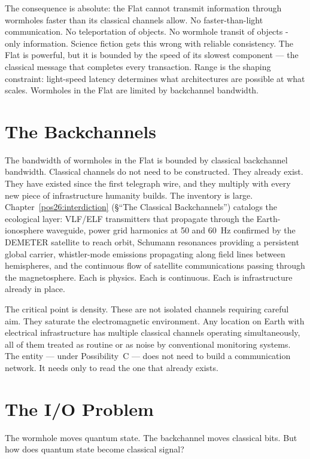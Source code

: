 The consequence is absolute: the Flat cannot transmit information through wormholes faster than its classical channels allow. No faster-than-light communication. No teleportation of objects. No wormhole transit of objects - only information. Science fiction gets this wrong with reliable consistency. The Flat is powerful, but it is bounded by the speed of its slowest component --- the classical message that completes every transaction. Range is the shaping constraint: light-speed latency determines what architectures are possible at what scales. Wormholes in the Flat are limited by backchannel bandwidth.

\section*{The Backchannels}
\label{what-is-the-flat:the-backchannels}
The bandwidth of wormholes in the Flat is bounded by classical backchannel bandwidth. Classical channels do not need to be constructed. They already exist. They have existed since the first telegraph wire, and they multiply with every new piece of infrastructure humanity builds. The inventory is large. Chapter~\ref{pos26:interdiction} (\S``The Classical Backchannels'') catalogs the ecological layer: VLF/ELF transmitters that propagate through the Earth-ionosphere waveguide, power grid harmonics at 50 and 60~Hz confirmed by the DEMETER satellite to reach orbit, Schumann resonances providing a persistent global carrier, whistler-mode emissions propagating along field lines between hemispheres, and the continuous flow of satellite communications passing through the magnetosphere. Each is physics. Each is continuous. Each is infrastructure already in place.

The critical point is density. These are not isolated channels requiring careful aim. They saturate the electromagnetic environment. Any location on Earth with electrical infrastructure has multiple classical channels operating simultaneously, all of them treated as routine or as noise by conventional monitoring systems. The entity --- under Possibility~C --- does not need to build a communication network. It needs only to read the one that already exists.

\section*{The I/O Problem}
\label{what-is-the-flat:the-io-problem}

The wormhole moves quantum state. The backchannel moves classical bits. But how does quantum state become classical signal?

